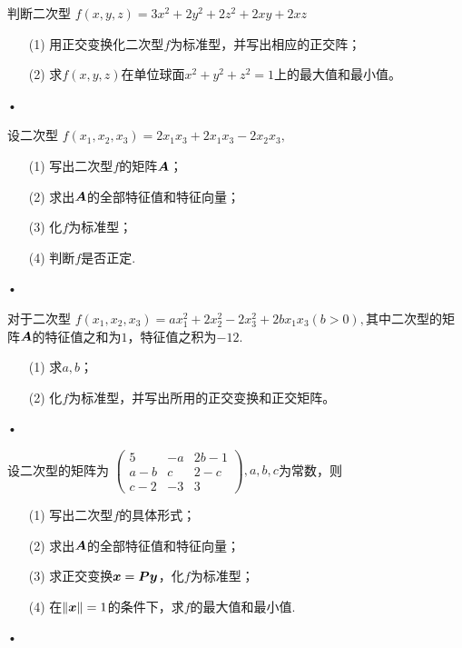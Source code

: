 \begin{frame}
  \begin{li}[2006-2007第二学期]
    判断二次型
    $
    f(x,y,z)=3x^2+2y^2+2z^2+2xy+2xz
    $
    \begin{itemize}
    \item[(1)] 用正交变换化二次型$f$为标准型，并写出相应的正交阵；
    \item[(2)]  求$f(x,y,z)$在单位球面$x^2+y^2+z^2=1$上的最大值和最小值。
    \end{itemize}•
  \end{li}
\end{frame}

\begin{frame}
  \begin{li}[2006-2007第二学期]
    设二次型
    $
    f(x_1,x_2,x_3)=2x_1x_3+2x_1x_3-2x_2x_3,
    $
    \begin{itemize}
    \item[(1)] 写出二次型$f$的矩阵$\boldsymbol{A}$；
    \item[(2)]  求出$\boldsymbol{A}$的全部特征值和特征向量；
    \item[(3)] 化$f$为标准型；
    \item[(4)] 判断$f$是否正定.
    \end{itemize}•
  \end{li}
  
\end{frame}


\begin{frame}
  
  \begin{li}
    对于二次型
    $
    f(x_1,x_2,x_3)=ax_1^2+2x_2^2-2x_3^2+2bx_1x_3(b>0),
    $其中二次型的矩阵$\boldsymbol{A}$的特征值之和为$1$，特征值之积为$-12$.
    \begin{itemize}
    \item[(1)] 求$a,b$；
    \item[(2)]  化$f$为标准型，并写出所用的正交变换和正交矩阵。
    \end{itemize}•
  \end{li}
\end{frame}

\begin{frame}
  \begin{li}[2007-2008第二学期]
    设二次型的矩阵为
    $
    \left(
      \begin{array}{ccc}
        5&-a&2b-1\\
        a-b&c&2-c\\
        c-2&-3&3
      \end{array}
    \right), a,b,c
    $为常数，则
    \begin{itemize}
    \item[(1)] 写出二次型$f$的具体形式；
    \item[(2)]  求出$\boldsymbol{A}$的全部特征值和特征向量；
    \item[(3)] 求正交变换${\boldsymbol{x}}=\boldsymbol{P}{\boldsymbol{y}}$，化$f$为标准型；
    \item[(4)] 在$\|{\boldsymbol{x}}\|=1$的条件下，求$f$的最大值和最小值.
    \end{itemize}•
  \end{li}
  
\end{frame}


